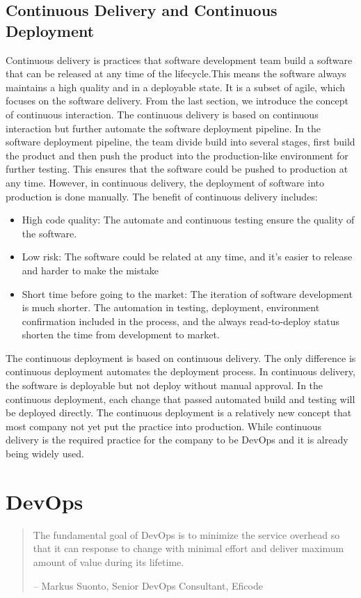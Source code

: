 \subsection{Continuous Delivery and Continuous Deployment}
Continuous delivery is practices that software development team build a software that can be released at any time of the lifecycle.\cite{fowler2013continuous}This means the software always maintains a high quality and in a deployable state.\cite{WhatisCo47:online} It is a subset of agile, which focuses on the software delivery.\cite{Continuo97:online} From the last section, we introduce the concept of continuous interaction. The continuous delivery is based on continuous interaction but further automate the software deployment pipeline. In the software deployment pipeline, the team divide build into several stages, first build the product and then push the product into the production-like environment for further testing. This ensures that the software could be pushed to production at any time. However, in continuous delivery, the deployment of software into production is done manually.
The benefit of continuous delivery includes:\cite{WhatisCo47:online}\cite{fowler2013continuous}
\begin{itemize}
    \item High code quality: The automate and continuous testing ensure the quality of the software.
    \item Low risk: The software could be related at any time, and it's easier to release and harder to make the mistake
    \item Short time before going to the market: The iteration of software development is much shorter. The automation in testing, deployment, environment confirmation included in the process, and the always read-to-deploy status shorten the time from development to market.
\end{itemize}
The continuous deployment is based on continuous delivery. The only difference is continuous deployment automates the deployment process. In continuous delivery, the software is deployable but not deploy without manual approval. In the continuous deployment, each change that passed automated build and testing will be deployed directly. The continuous deployment is a relatively new concept that most company not yet put the practice into production.\cite{leppanen2015highways} While continuous delivery is the required practice for the company to be DevOps and it is already being widely used.
\section{DevOps}
\begin{quotation}
    The fundamental goal of DevOps is to minimize the service overhead so that it can response to change with minimal effort and deliver maximum amount of value during its lifetime.
    \begin{flushright}
        -- Markus Suonto, Senior DevOps Consultant, Eficode
    \end{flushright}
\end{quotation}

